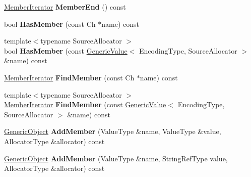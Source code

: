 \begin{DoxyCompactItemize}
\item 
\hyperlink{class_generic_member_iterator}{Member\+Iterator} {\bfseries Member\+End} () const \hypertarget{class_generic_object_a7dedae79a478db0aeb4e01df4c788f3a}{}\label{class_generic_object_a7dedae79a478db0aeb4e01df4c788f3a}

\item 
bool {\bfseries Has\+Member} (const Ch $\ast$name) const \hypertarget{class_generic_object_a545cbb3d1e99a48fd7a40ebeac1d10da}{}\label{class_generic_object_a545cbb3d1e99a48fd7a40ebeac1d10da}

\item 
{\footnotesize template$<$typename Source\+Allocator $>$ }\\bool {\bfseries Has\+Member} (const \hyperlink{class_generic_value}{Generic\+Value}$<$ Encoding\+Type, Source\+Allocator $>$ \&name) const \hypertarget{class_generic_object_a946712fa1b4fc9ab551a63d17d671f47}{}\label{class_generic_object_a946712fa1b4fc9ab551a63d17d671f47}

\item 
\hyperlink{class_generic_member_iterator}{Member\+Iterator} {\bfseries Find\+Member} (const Ch $\ast$name) const \hypertarget{class_generic_object_a6713425c66b7f05e4ac5d251a8f5b708}{}\label{class_generic_object_a6713425c66b7f05e4ac5d251a8f5b708}

\item 
{\footnotesize template$<$typename Source\+Allocator $>$ }\\\hyperlink{class_generic_member_iterator}{Member\+Iterator} {\bfseries Find\+Member} (const \hyperlink{class_generic_value}{Generic\+Value}$<$ Encoding\+Type, Source\+Allocator $>$ \&name) const \hypertarget{class_generic_object_a3eca7c61d4d2b728de83ffdb1f35e45a}{}\label{class_generic_object_a3eca7c61d4d2b728de83ffdb1f35e45a}

\item 
\hyperlink{class_generic_object}{Generic\+Object} {\bfseries Add\+Member} (Value\+Type \&name, Value\+Type \&value, Allocator\+Type \&allocator) const \hypertarget{class_generic_object_a59554f8232c7c2a74d8043f4b4b20ec2}{}\label{class_generic_object_a59554f8232c7c2a74d8043f4b4b20ec2}

\item 
\hyperlink{class_generic_object}{Generic\+Object} {\bfseries Add\+Member} (Value\+Type \&name, String\+Ref\+Type value, Allocator\+Type \&allocator) const \hypertarget{class_generic_object_a33df672a1ecafa47c2d7ed3c765738c1}{}\label{class_generic_object_a33df672a1ecafa47c2d7ed3c765738c1}


\end{DoxyCompactItemize}
